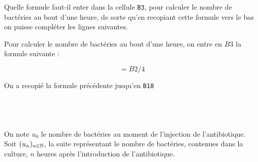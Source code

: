 \begin{questions}
	\question[1] Quelle formule faut-il enter dans la cellule \texttt{B3}, pour calculer le nombre de bactéries au bout d'une heure, de sorte qu'en recopiant cette formule vers le bas on puisse compléter les lignes suivantes.
	\begin{solution}
		Pour calculer le nombre de bactéries au bout d'une heure, on entre en $B3$ la formule suivante :
		
		\begin{equation*}
			= B2 / 4
		\end{equation*}
	\end{solution}
	
	
	\question[1]  On a recopié la formule précédente jusqu'en \texttt{B18} 
	
	
\end{questions}

\subsection{\ }

On note $u_0$ le nombre de bactéries au moment de l'injection de l'antibiotique.
Soit $(u_n)_{n \in \mathbb{N}}$, la suite représentant le nombre de bactéries, contenues dans la culture, $n$ heures après l'introduction de l'antibiotique. 

